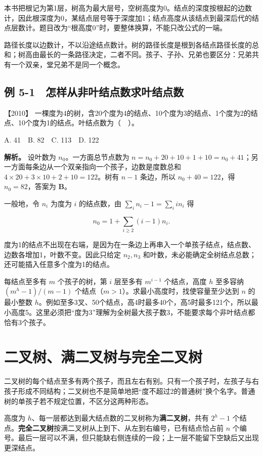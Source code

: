 本书把根记为第1层，树高为最大层号，空树高度为0。结点的深度按根起的边数计，因此根深度为0，某结点层号等于深度加1；结点高度从该结点到最深后代的结点层数计。题目改为``根高度0''时，要整体换算，不能只改公式的一端。

路径长度以边数计，不以沿途结点数计。树的路径长度是根到各结点路径长度的总和；树高由最长的一条路径决定，二者不同。孩子、子孙、兄弟也要区分：兄弟共有一个双亲，堂兄弟不是同一个概念。

\subsection{例 5-1　怎样从非叶结点数求叶结点数}\label{ds-ex5-1}

\noindent{}【2010】 一棵度为4的树，含20个度为4的结点、10个度为3的结点、1个度为2的结点、10个度为1的结点。叶结点数为（　）。

A. 41　B. 82　C. 113　D. 122


\textbf{解析。} 设叶数为 \(n_0\)。一方面总节点数为 \(n=n_0+20+10+1+10=n_0+41\)；另一方面每条边从一个双亲指向一个孩子，边数是度数总和 \(4\times20+3\times10+2+10=122\)。树有 \(n-1\) 条边，所以 \(n_0+40=122\)，得 \(n_0=82\)，答案为 \textbf{B}。

一般地，令 \(n_i\) 为度为 \(i\) 的结点数，由 \(\sum_i n_i-1=\sum_i i n_i\) 得

\[n_0=1+\sum_{i\ge2}(i-1)n_i.\]

度为1的结点不出现在右端，是因为在一条边上再串入一个单孩子结点，结点数、边数各增加1，叶数不变。因此只给定 \(n_2,n_3\) 和叶数，未必能确定全树结点总数；还可能插入任意多个度为1的结点。

每结点至多有 \(m\) 个孩子的树，第 \(i\) 层至多有 \(m^{i-1}\) 个结点，高度 \(h\) 至多容纳 \((m^h-1)/(m-1)\) 个结点（\(m>1\)）。求最小高度时，找使容量至少达到 \(n\) 的最小整数 \(h\)。例如至多3叉、50个结点，高4时最多40个，高5时最多121个，所以最小高度5。这里必须把``度为3''理解为全树最大孩子数3，不能要求每个非叶结点都恰有3个孩子。

\section{二叉树、满二叉树与完全二叉树}\label{ds-05-02}

二叉树的每个结点至多有两个孩子，而且左右有别。只有一个孩子时，左孩子与右孩子形成不同结构；二叉树也不是简单地把``度不超过2的普通树''换个名字。普通树的单孩子若不规定位置，不区分这两种形态。

高度为 \(h\)、每一层都达到最大结点数的二叉树称为\textbf{满二叉树}，共有 \(2^h-1\) 个结点。\textbf{完全二叉树}按满二叉树从上到下、从左到右编号，已有结点恰占前 \(n\) 个编号。最后一层可以不满，但只能缺右侧连续的一段；上一层不能留下空缺后又出现更深结点。

